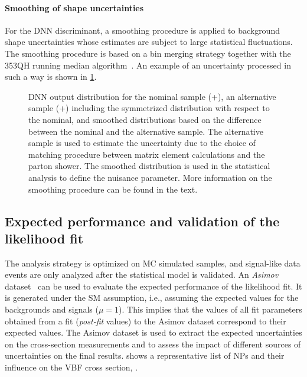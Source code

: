 \paragraph{Smoothing of shape uncertainties}
For the DNN discriminant, a smoothing procedure is applied to background shape uncertainties whose estimates are subject to large statistical fluctuations. 
The smoothing procedure is based on a bin merging strategy together with the 353QH running median algorithm~\cite{Friedman353QH}. 
An example of an uncertainty processed in such a way is shown in \cref{fig:dnn:smoothing}.

\begin{figure}[h!]
    \centering
    {\caption[DNN output distribution for the nominal and an alternative \ttbar sample.]{DNN output distribution for the nominal \ttbar sample (\Powheg+\PYTHIA[8]), an alternative sample (\aMCATNLO+\PYTHIA[8]) including the symmetrized distribution with respect to the nominal, and smoothed distributions based on the difference between the nominal and the alternative sample. The alternative sample is used to estimate the uncertainty due to the choice of matching procedure between matrix element calculations and the parton shower. The smoothed distribution is used in the statistical analysis to define the nuisance parameter. More information on the smoothing procedure can be found in the text.
    \label{fig:dnn:smoothing} }}
\end{figure}

\subsection{Expected performance and validation of the likelihood fit}
\label{subsec:expected-performannce}
The analysis strategy is optimized on MC simulated samples, and signal-like data events are only analyzed after the statistical model is validated.
An \emph{Asimov} dataset~\cite{Cowan:2010js} can be used to evaluate the expected performance of the likelihood fit. It is generated under the SM assumption, i.e., assuming the expected values for the backgrounds and signals ($\mu=1$). 
This implies that the values of all fit parameters obtained from a fit (\emph{post-fit} values) to the Asimov dataset correspond to their expected values. 
The Asimov dataset is used to extract the expected uncertainties on the cross-section measurements and to assess the impact of different sources of uncertainties on the final results. 
 shows a representative list of NPs and their influence on the VBF cross section, \sigmaVBF. 

